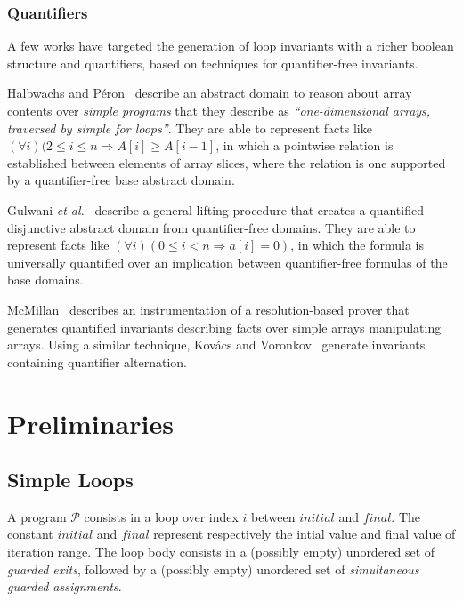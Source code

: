 \documentclass[a4paper,10pt]{article}
\newcommand{\etal}{\textit{et al.}\xspace}
\newcommand{\prog}{\ensuremath{\mathcal{P}}\xspace}
\newcommand{\idx}{\ensuremath{i}\xspace}
\newcommand{\idxinitial}{\ensuremath{\mathit{initial}}\xspace}
\newcommand{\idxfinal}{\ensuremath{\mathit{final}}\xspace}
\newcommand{\impl}{\ensuremath{\Longrightarrow}}
\begin{document}
\subsubsection*{Quantifiers}

A few works have targeted the generation of loop invariants with a richer
boolean structure and quantifiers, based on techniques for quantifier-free
invariants.

Halbwachs and Péron~\cite{halbwachs:2008:pldi} describe an abstract domain to
reason about array contents over \textit{simple programs} that they describe as
\textit{``one-dimensional arrays, traversed by simple for loops''}. They are
able to represent facts like $(\forall i)(2 \leq i \leq n \impl A[i] \geq
A[i−1]$, in which a pointwise relation is established between elements of array
slices, where the relation is one supported by a quantifier-free base abstract
domain.

Gulwani \etal~\cite{gulwani:2008:popl} describe a general lifting procedure
that creates a quantified disjunctive abstract domain from quantifier-free
domains. They are able to represent facts like $(\forall i)(0 \leq i < n \impl
a[i] = 0)$, in which the formula is universally quantified over an implication
between quantifier-free formulas of the base domains.

McMillan~\cite{mcmillan:2008:tacas} describes an instrumentation of a
resolution-based prover that generates quantified invariants describing facts
over simple arrays manipulating arrays. Using a similar technique, Kov\'acs and
Voronkov~\cite{kovacs:2009:fli} generate invariants containing quantifier
alternation.

\section{Preliminaries}

\subsection{Simple Loops}
\label{sec:simple-loops}
A program \prog consists in a loop over index \idx between \idxinitial and \idxfinal. 
The constant \idxinitial and \idxfinal represent respectively the intial value and final
value of iteration range.
The loop body consists in a (possibly empty) unordered set of \textit{guarded exits},
followed by a (possibly empty) unordered set of \textit{simultaneous guarded assignments}.

\newcommand{\expr}{\ensuremath{\mathit{expr}}}
\newcommand{\assign}{\ensuremath{\mathit{assign}}}
\newcommand{\gexit}{\ensuremath{\mathit{guardexit}}}
\newcommand{\gassign}{\ensuremath{\mathit{guardassign}}}
\newcommand{\location}{\ensuremath{\mathit{location}}}
\end{document}
